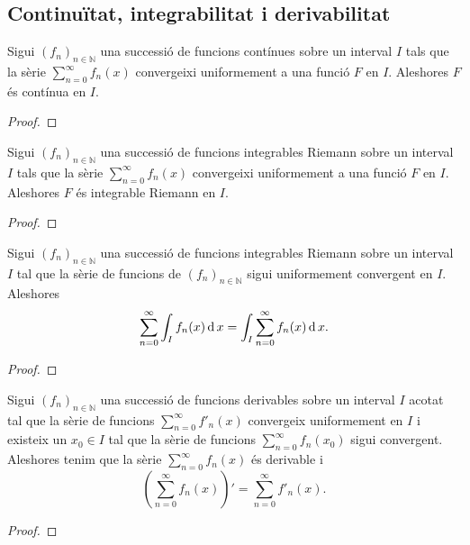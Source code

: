 \documentclass[../../Main.tex]{subfiles}
\begin{document}
	\subsection{Continuïtat, integrabilitat i derivabilitat}
	\begin{theorem}
		\label{thm:si la sèrie de d'una successió de funcions contínues convergeix uniformement, el seu límit és una funció contínua}
		Sigui \((f_{n})_{n\in\mathbb{N}}\) una successió de funcions contínues sobre un interval \(I\) tals que la sèrie \(\sum_{n=0}^{\infty}f_{n}(x)\) convergeixi uniformement a una funció \(F\) en \(I\). Aleshores \(F\) és contínua en \(I\).
		\begin{proof}
		\end{proof}
	\end{theorem}
	\begin{theorem}
		\label{thm:si la sèrie de d'una successió de funcions integrables Riemann convergeix uniformement, el seu límit és una funció integrable Riemann}
		Sigui \((f_{n})_{n\in\mathbb{N}}\) una successió de funcions integrables Riemann sobre un interval \(I\) tals que la sèrie \(\sum_{n=0}^{\infty}f_{n}(x)\) convergeixi uniformement a una funció \(F\) en \(I\). Aleshores \(F\) és integrable Riemann en \(I\).
		\begin{proof}
		\end{proof}
	\end{theorem}
	\begin{theorem}
		\label{thm:si la sèrie d'una successió de funcions convergeix uniformement aleshores el límit de la integral dels elements de la sèrie de la succesió és la integral del límit del la sèrie de la successió}
		Sigui \((f_{n})_{n\in\mathbb{N}}\) una successió de funcions integrables Riemann sobre un interval \(I\) tal que la sèrie de funcions de \((f_{n})_{n\in\mathbb{N}}\) sigui uniformement convergent en \(I\). Aleshores
		\[\sum_{n=0}^{\infty}\int_{I}f_{n}(x)\operatorname{d} x=\int_{I}\sum_{n=0}^{\infty}f_{n}(x)\operatorname{d} x.\]
		\begin{proof}
		\end{proof}
	\end{theorem}
	\begin{theorem}
		\label{thm:condició per la derivabilitat d'una sèrie de funcions}
		Sigui \((f_{n})_{n\in\mathbb{N}}\) una successió de funcions derivables sobre un interval \(I\) acotat tal que la sèrie de funcions \(\sum_{n=0}^{\infty}f'_{n}(x)\) convergeix uniformement en \(I\) i existeix un \(x_{0}\in I\) tal que la sèrie de funcions \(\sum_{n=0}^{\infty}f_{n}(x_{0})\) sigui convergent. Aleshores tenim que la sèrie \(\sum_{n=0}^{\infty}f_{n}(x)\) és derivable i
		\[\left(\sum_{n=0}^{\infty}f_{n}(x)\right)'=\sum_{n=0}^{\infty}f'_{n}(x).\]
		\begin{proof}
		\end{proof}
	\end{theorem}
\end{document}
